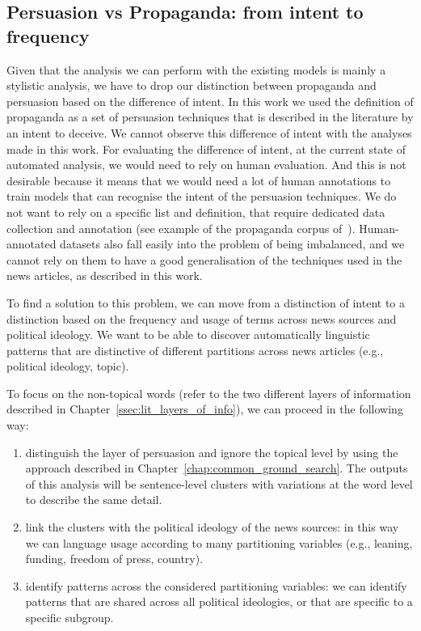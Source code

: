 \subsection{Persuasion vs Propaganda: from intent to frequency}
Given that the analysis we can perform with the existing models is mainly a stylistic analysis, we have to drop our distinction between propaganda and persuasion based on the difference of intent.
In this work we used the definition of propaganda as a set of persuasion techniques that is described in the literature by an intent to deceive.
We cannot observe this difference of intent with the analyses made in this work.
For evaluating the difference of intent, at the current state of automated analysis, we would need to rely on human evaluation.
And this is not desirable because it means that we would need a lot of human annotations to train models that can recognise the intent of the persuasion techniques.
We do not want to rely on a specific list and definition, that require dedicated data collection and annotation (see example of the propaganda corpus of~\citet{da2019fine}).
Human-annotated datasets also fall easily into the problem of being imbalanced, and we cannot rely on them to have a good generalisation of the techniques used in the news articles, as described in this work.

To find a solution to this problem, we can move from a distinction of intent to a distinction based on the frequency and usage of terms across news sources and political ideology.
We want to be able to discover automatically linguistic patterns that are distinctive of different partitions across news articles (e.g., political ideology, topic).

To focus on the non-topical words (refer to the two different layers of information described in Chapter~\ref{ssec:lit_layers_of_info}), we can proceed in the following way:

\begin{enumerate}
    \item distinguish the layer of persuasion and ignore the topical level by using the approach described in Chapter~\ref{chap:common_ground_search}. The outputs of this analysis will be sentence-level clusters with variations at the word level to describe the same detail.
    \item link the clusters with the political ideology of the news sources: in this way we can language usage according to many partitioning variables (e.g., leaning, funding, freedom of press, country).
    \item identify patterns across the considered partitioning variables: we can identify patterns that are shared across all political ideologies, or that are specific to a specific subgroup.
\end{enumerate}

